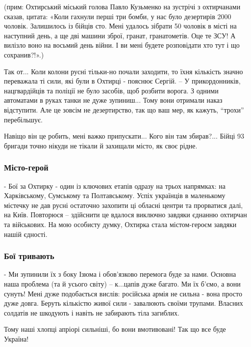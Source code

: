 (прим: Охтирський міський голова Павло Кузьменко на зустрічі з охтирчанами
сказав, цитата: «Коли гахнули перші три бомби, у нас було дезертирів 2000
чоловік. Залишилось із бійців сто. Мені удалось зібрати 50 чоловік в місті на
наступний день, а ще дві машини зброї, гранат, гранатометів. Оце те ЗСУ! А
вилізло воно на восьмий день війни. І ви мені будете розповідати хто тут і що
сохранив?!».)

Так от... Коли колони русні тільки-но почали заходити, то їхня кількість значно
переважала ті сили, які були в Охтирці - пояснює Сергій. – У прикордонників,
нацгвардійців та поліції не було засобів, щоб розбити ворога. З одними
автоматами в руках танки не дуже зупиниш... Тому вони отримали наказ
відступити. Але це зовсім не дезертирство, так що ваш мер, як кажуть,
\enquote{трохи} перебільшує.

Навіщо він це робить, мені важко припускати... Кого він там збирав?... Бійці 93
бригади точно нікуди не тікали й захищали місто, як своє рідне. 

\subsubsection{Місто-герой}

- Бої за Охтирку - один із ключових етапів одразу на трьох напрямках: на
Харківському, Сумському та Полтавському. Успіх українців в маленькому містечку
не дав русні остаточно захопити ці обласні центри та прорватися далі, на Київ.
Повторюся – здійснити це вдалося виключно завдяки єднанню охтирчан та
військових. На мою особисту думку, Охтирка стала містом-героєм завдяки нашій
єдності.

\subsubsection{Бої тривають}

- Ми зупинили їх з боку Ізюма і обов'язково перемога буде за нами. Основна наша
проблема (та й усього світу) – к...цапів дуже багато. Ми їх б'ємо, а вони
сунуть! Мені дуже подобається вислів: російська армія не сильна - вона просто
дуже довга. Беруть кількістю живої сили - завалюють своїми трупами. Власних
солдатів не шкодують і навіть не забирають тіла загиблих.

Тому наші хлопці апріорі сильніші, бо вони вмотивовані! Так що все буде
Україна!
